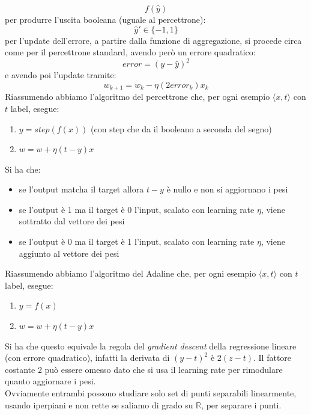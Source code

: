 \documentclass[a4paper,12pt, oneside]{book}
\begin{document}
\[f(\hat{y})\]
per produrre l'uscita booleana (uguale al percettrone):
\[\hat{y}'\in\{-1,1\}\]
per l'update dell'errore, a partire dalla funzione di aggregazione, si procede
circa come per il percettrone standard, avendo però un errore quadratico:
\[error=(y-\hat{y})^2\]
e avendo poi l'update tramite:
\[w_{k+1}=w_k-\eta(2error_k)x_k\]
Riassumendo abbiamo l'algoritmo del percettrone che, per ogni esempio $\langle
x,t\rangle$ con $t$ label, esegue:
\begin{enumerate}
  \item $y=step(f(x))$ (con step che da il booleano a seconda del segno)
  \item $w=w+\eta(t-y)x$
\end{enumerate}
Si ha che:
\begin{itemize}
  \item se l'output matcha il target allora $t-y$ è nullo e non si aggiornano i
  pesi
  \item se l'output è 1 ma il target è 0 l'input, scalato con learning rate
  $\eta$, viene sottratto dal vettore dei pesi
  \item se l'output è 0 ma il target è 1 l'input, scalato con learning rate
  $\eta$, viene aggiunto al vettore dei pesi
\end{itemize}
Riassumendo abbiamo l'algoritmo del Adaline che, per ogni esempio $\langle
x,t\rangle$ con $t$ label, esegue:
\begin{enumerate}
  \item $y=f(x)$
  \item $w=w+\eta(t-y)x$
\end{enumerate}
Si ha che questo equivale la regola del \textit{gradient descent} della
regressione lineare (con errore quadratico), infatti la derivata di $(y-t)^2$ è
$2(z-t)$. Il fattore costante 2 può essere omesso dato che si usa il learning
rate per rimodulare quanto aggiornare i pesi.\\
Ovviamente entrambi possono studiare solo set di punti separabili linearmente,
usando iperpiani e non rette se saliamo di grado su $\mathbb{R}$, per separare i
punti.
\end{document}

